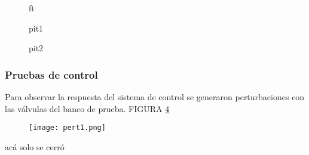 \begin{comment}
	C:\Users\glori\Desktop\DANIELA\VISUAL_DANI\Automa\MATLAB\22-05\Comparacion PID y PLANTAS\FT001
	Respuesta_Strenj
\end{comment}





\begin{figure}[htbp]
	\centering
\hspace{-4mm}
	\caption{ft} \label{fig:FT1}
\end{figure}

\begin{figure}[htbp]
	\centering
\hspace{-4mm}
	\caption{pit1} \label{fig:PIT1}
\end{figure}

\begin{figure}[htbp]
	\centering
	\hspace{-4mm}
	\caption{pit2} \label{fig:PIT2}
\end{figure}


\subsubsection{Pruebas de control}
Para observar la respuesta del sistema de control se generaron perturbaciones con las válvulas del banco de prueba. FIGURA \ref{fig:pert1}
\begin{figure}[htb]
	\centering
	\texttt{[image: pert1.png]}
	\label{fig:pert1}
\end{figure}
 acá solo se cerró


